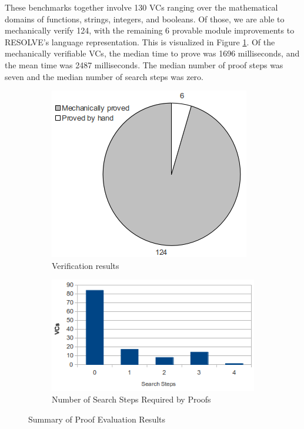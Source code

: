 These benchmarks together involve 130 VCs ranging over the mathematical domains of functions, strings, integers, and booleans.  Of those, we are able to mechanically verify 124, with the remaining 6 provable module improvements to RESOLVE's language representation.  This is visualized in Figure \ref{fig:pie}.  Of the mechanically verifiable VCs, the median time to prove was 1696 milliseconds, and the mean time was 2487 milliseconds.  The median number of proof steps was seven and the median number of search steps was zero.

\begin{figure}
	\centering
	\begin{subfigure}[b]{0.40\textwidth}
		\centering
		\includegraphics[width=\textwidth]{proverEval/proofResults2.png}
		\caption{Verification results\label{fig:pie}}
	\end{subfigure}
	\quad
	\begin{subfigure}[b]{0.55\textwidth}
		\centering
		\includegraphics[width=\textwidth]{proverEval/searchSteps.png}
		\caption{Number of Search Steps Required by Proofs\label{fig:histogram}}
	\end{subfigure}
	\caption{Summary of Proof Evaluation Results}
\end{figure}

